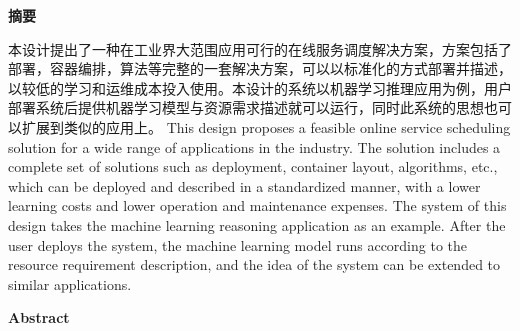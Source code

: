 \begin{center}
    \bfseries {} 摘要
\end{center}

本设计提出了一种在工业界大范围应用可行的在线服务调度解决方案，方案包括了部署，容器编排，算法等完整的一套解决方案，可以以标准化的方式部署并描述，以较低的学习和运维成本投入使用。本设计的系统以机器学习推理应用为例，用户部署系统后提供机器学习模型与资源需求描述就可以运行，同时此系统的思想也可以扩展到类似的应用上。
This design proposes a feasible online service scheduling solution for a wide range of applications in the industry. The solution includes a complete set of solutions such as deployment, container layout, algorithms, etc., which can be deployed and described in a standardized manner, with a lower learning costs and lower operation and maintenance expenses. The system of this design takes the machine learning reasoning application as an example. After the user deploys the system, the machine learning model runs according to the resource requirement description, and the idea of the system can be extended to similar applications.

\begin{center}
    \bfseries {} Abstract
\end{center}
